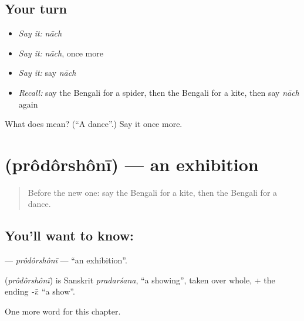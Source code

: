 \subsection*{Your turn}
\begin{itemize}
\raggedright
  \item \emph{Say it:} \emph{nāch}
  \item \emph{Say it:} \emph{nāch}, once more
  \item \emph{Say it:} say \emph{nāch}
  \item \emph{Recall:} say the Bengali for a spider, then the Bengali for a kite, then say \emph{nāch} again
\end{itemize}

\begin{tcolorbox}[breakable,colback=teal!4,colframe=teal!35!black,title={Before you move on}]
What does  mean? (\textquotedblleft{}A dance\textquotedblright{}.) Say it once more.
\end{tcolorbox}
\section[\texorpdfstring{\bn{প্রদর্শনী} (prôdôrshônī)}{প্রদর্শনী (prôdôrshônī)}]{ (prôdôrshônī) — an exhibition}

\label{lesson:BN-C251-prodorshoni}



\begin{quote}
Before the new one: say the Bengali for a kite, then the Bengali for a dance.
\end{quote}

\subsection*{You'll want to know: }
\textbf{} — \emph{prôdôrshônī} — \textquotedblleft{}an exhibition\textquotedblright{}.

\begin{cousinweb}
\textbf{} (\emph{prôdôrshônī}) is Sanskrit \emph{pradarśana}, \textquotedblleft{}a showing\textquotedblright{}, taken over whole, + the ending \emph{-ī}: \textquotedblleft{}a show\textquotedblright{}.
\end{cousinweb}

\begin{grammarlens}[title={What you've built}]
One more word for this chapter.
\end{grammarlens}

